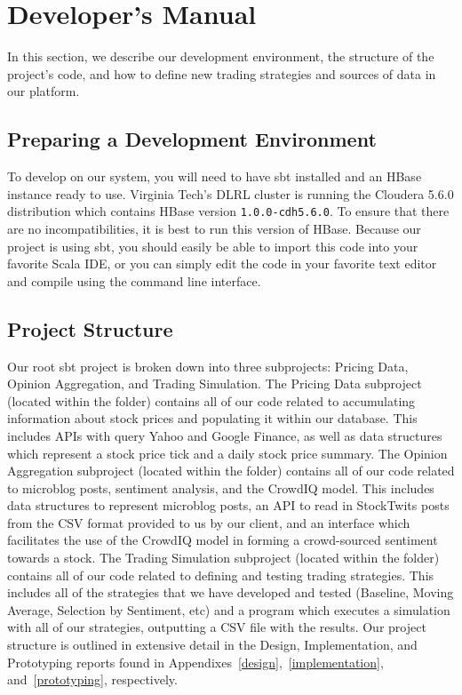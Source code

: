 \section{Developer's Manual}

In this section, we describe our development environment, the structure of the project's code, and how to define new trading strategies and sources of data in our platform.

\subsection{Preparing a Development Environment}

To develop on our system, you will need to have sbt\cite{sbt} installed and an HBase\cite{hbase} instance ready to use. Virginia Tech's DLRL cluster is running the Cloudera 5.6.0 distribution which contains HBase version \texttt{1.0.0-cdh5.6.0}. To ensure that there are no incompatibilities, it is best to run this version of HBase. Because our project is using sbt, you should easily be able to import this code into your favorite Scala IDE, or you can simply edit the code in your favorite text editor and compile using the command line interface.

\subsection{Project Structure}

Our root sbt project is broken down into three subprojects: Pricing Data, Opinion Aggregation, and Trading Simulation.
The Pricing Data subproject (located within the  folder) contains all of our code related to accumulating information about stock prices and populating it within our database.
This includes APIs with query Yahoo and Google Finance, as well as data structures which represent a stock price tick and a daily stock price summary.
The Opinion Aggregation subproject (located within the  folder) contains all of our code related to microblog posts, sentiment analysis, and the CrowdIQ model.
This includes data structures to represent microblog posts, an API to read in StockTwits posts from the CSV format provided to us by our client, and an interface which facilitates the use of the CrowdIQ model in forming a crowd-sourced sentiment towards a stock.
The Trading Simulation subproject (located within the  folder) contains all of our code related to defining and testing trading strategies.
This includes all of the strategies that we have developed and tested (Baseline, Moving Average, Selection by Sentiment, etc) and a program which executes a simulation with all of our strategies, outputting a CSV file with the results.
Our project structure is outlined in extensive detail in the Design, Implementation, and Prototyping reports found in Appendixes~\ref{design},~\ref{implementation}, and~\ref{prototyping}, respectively.

